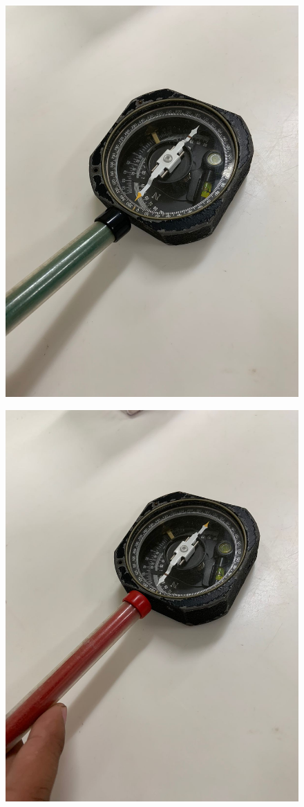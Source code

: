 \documentclass[twocolumn, 12pt]{article}
\begin{document}
\begin{figure}[H]
	\includegraphics[width=0.9\linewidth]{./Images/BrujulaImagen1.jpeg}
\end{figure}

\begin{figure}[H]
	\includegraphics[width=0.9\linewidth]{./Images/BrujulaImagen2.jpeg}
\end{figure}
\end{document}
